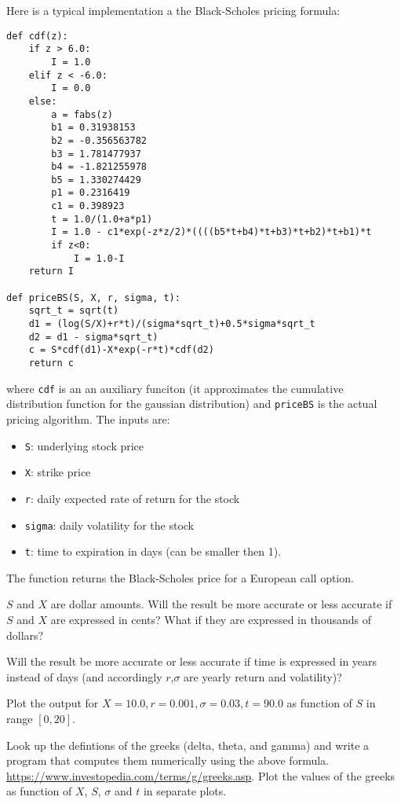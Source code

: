 \documentclass[12pt]{article}
\begin{document}
Here is a typical implementation a the Black-Scholes pricing formula:

\begin{verbatim}
def cdf(z):
    if z > 6.0:
        I = 1.0
    elif z < -6.0:
        I = 0.0
    else:
        a = fabs(z)
        b1 = 0.31938153
        b2 = -0.356563782
        b3 = 1.781477937
        b4 = -1.821255978
        b5 = 1.330274429
        p1 = 0.2316419
        c1 = 0.398923
        t = 1.0/(1.0+a*p1)
        I = 1.0 - c1*exp(-z*z/2)*((((b5*t+b4)*t+b3)*t+b2)*t+b1)*t
        if z<0:
            I = 1.0-I
    return I

def priceBS(S, X, r, sigma, t):
    sqrt_t = sqrt(t)
    d1 = (log(S/X)+r*t)/(sigma*sqrt_t)+0.5*sigma*sqrt_t
    d2 = d1 - sigma*sqrt_t)
    c = S*cdf(d1)-X*exp(-r*t)*cdf(d2)
    return c
\end{verbatim}

where {\tt cdf} is an an auxiliary funciton (it approximates the cumulative distribution function for the gaussian distribution) and {\tt priceBS} is the actual pricing algorithm. The inputs are:
\begin{itemize}
\item {\tt S}: underlying stock price 
\item {\tt X}: strike price
\item {\tt r}: daily expected rate of return for the stock
\item {\tt sigma}: daily volatility for the stock
\item {\tt t}: time to expiration in days (can be smaller then 1).
\end{itemize}

The function returns the Black-Scholes price for a European call option.

$S$ and $X$ are dollar amounts. Will the result be more accurate or less accurate if $S$ and $X$ are expressed in cents? What if they are expressed in thousands of dollars?

Will the result be more accurate or less accurate if time is expressed in years instead of days (and accordingly $r$,$\sigma$ are yearly return and volatility)?

Plot the output for $X=10.0,r=0.001,\sigma=0.03,t=90.0$ as function of $S$ in range $[0,20]$.

Look up the defintions of the greeks (delta, theta, and gamma) and write a program that computes them numerically using the above formula. \url{https://www.investopedia.com/terms/g/greeks.asp}. Plot the values of the greeks as function of $X$, $S$, $\sigma$ and $t$ in separate plots.
\end{document}
